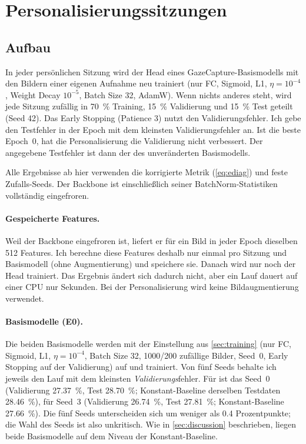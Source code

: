 \section{Personalisierungssitzungen}
\label{sec:sessions}

\subsection{Aufbau}
\label{sec:sessions_setup}

In jeder persönlichen Sitzung wird der Head eines GazeCapture-Basismodells
mit den Bildern einer eigenen Aufnahme neu trainiert (nur FC, Sigmoid, L1,
$\eta=10^{-4}$, Weight Decay $10^{-5}$, Batch Size 32, AdamW). Wenn nichts
anderes steht, wird jede Sitzung zufällig in \SI{70}{\percent} Training,
\SI{15}{\percent} Validierung und \SI{15}{\percent} Test geteilt (Seed 42).
Das Early Stopping (Patience 3) nutzt den Validierungsfehler. Ich gebe den
Testfehler in der Epoch mit dem kleinsten Validierungsfehler an. Ist die beste
Epoch~0, hat die Personalisierung die Validierung nicht verbessert. Der
angegebene Testfehler ist dann der des unveränderten Basismodells.

Alle Ergebnisse ab hier verwenden die korrigierte Metrik (\cref{eq:ediag})
und feste Zufalls-Seeds. Der Backbone ist einschließlich
seiner BatchNorm-Statistiken vollständig eingefroren.

\paragraph{Gespeicherte Features.} Weil der Backbone eingefroren ist, liefert er für
ein Bild in jeder Epoch dieselben 512 Features. Ich berechne diese Features
deshalb nur einmal pro Sitzung und Basismodell (ohne Augmentierung) und
speichere sie. Danach wird nur noch der Head trainiert. Das Ergebnis ändert
sich dadurch nicht, aber ein Lauf dauert auf einer CPU nur Sekunden. Bei der
Personalisierung wird keine Bildaugmentierung verwendet.

\paragraph{Basismodelle (E0).} Die beiden Basismodelle werden mit der
Einstellung aus \cref{sec:training} (nur FC, Sigmoid, L1, $\eta=10^{-4}$,
Batch Size 32, \num{1000}/\num{200} zufällige Bilder, Seed~0, Early Stopping
auf der Validierung) auf  und 
trainiert. Von fünf Seeds behalte ich jeweils den Lauf mit dem kleinsten
\emph{Validierungs}fehler. Für  ist das Seed~0 (Validierung
\SI{27,37}{\percent}, Test \SI{28,70}{\percent}; Konstant-Baseline derselben
Testdaten \SI{28,46}{\percent}), für  Seed~3 (Validierung
\SI{26,74}{\percent}, Test \SI{27,81}{\percent}; Konstant-Baseline
\SI{27,66}{\percent}). Die fünf Seeds unterscheiden sich um weniger als
\num{0,4} Prozentpunkte; die Wahl des Seeds ist also unkritisch. Wie in
\cref{sec:discussion} beschrieben, liegen beide Basismodelle auf dem Niveau der
Konstant-Baseline.

